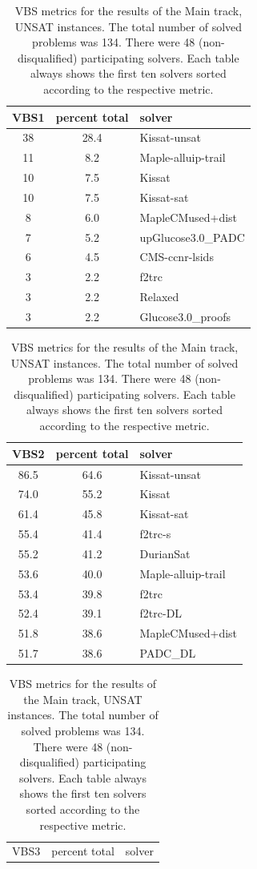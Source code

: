 \documentclass{elsarticle}
\begin{document}
\begin{table}
\caption{VBS metrics for the results of the Main track, UNSAT instances. 
The total number of solved problems was 134. 
There were 48 (non-disqualified) participating solvers.
Each table always shows the first ten solvers sorted according to the respective metric.}
\label{tab:vbsMainUNSAT}
\begin{center}
\begin{tabular}{ccl}
VBS1 & percent total & solver \\
\hline
38 & 28.4 & Kissat-unsat \\
11 & \phantom{0}8.2 & Maple-alluip-trail \\
10 & \phantom{0}7.5 & Kissat \\
10 & \phantom{0}7.5 & Kissat-sat \\
\phantom{0}8 & \phantom{0}6.0 & MapleCMused+dist \\
\phantom{0}7 & \phantom{0}5.2 & upGlucose3.0\_PADC \\
\phantom{0}6 & \phantom{0}4.5 & CMS-ccnr-lsids \\
\phantom{0}3 & \phantom{0}2.2 & f2trc \\
\phantom{0}3 & \phantom{0}2.2 & Relaxed \\
\phantom{0}3 & \phantom{0}2.2 & Glucose3.0\_proofs \\
\end{tabular}
\end{center}
\begin{center}
\begin{tabular}{ccl}
VBS2 & percent total & solver \\
\hline
86.5 & 64.6 & Kissat-unsat \\
74.0 & 55.2 & Kissat \\
61.4 & 45.8 & Kissat-sat \\
55.4 & 41.4 & f2trc-s \\
55.2 & 41.2 & DurianSat \\
53.6 & 40.0 & Maple-alluip-trail \\
53.4 & 39.8 & f2trc \\
52.4 & 39.1 & f2trc-DL \\
51.8 & 38.6 & MapleCMused+dist \\
51.7 & 38.6 & PADC\_DL \\
\end{tabular}
\end{center}
\begin{center}
\begin{tabular}{ccl}
VBS3 & percent total & solver \\

\end{tabular}
\end{center}
\end{table}
\end{document}
